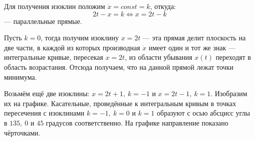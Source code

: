 \documentclass[a4paper,12pt]{article}
\newcommand{\dx}{\dot{x}}
\begin{document}
Для получения изоклин положим $\dx = const = k$, откуда:
\[2t - x = k \iff x = 2t - k\] --- параллельные прямые.

Пусть $k = 0$, тогда получим изоклину $x = 2t$ --- эта прямая делит плоскость на две части, в каждой из которых производная $\dx$ имеет один и тот же знак --- интегральные кривые, пересекая $x = 2t$, из области убывания $x(t)$ переходят в область возрастания. Отсюда получаем, что на данной прямой лежат точки минимума.

Возьмём ещё две изоклины: $x = 2t + 1,\ k = -1$ и $x = 2t - 1,\ k = 1$. Изобразим их на графике. Касательные, проведённые к интегральным кривым в точках пересечения с изоклинами $k = -1,\ k = 0$ и $k = 1$ образуют с осью абсцисс углы в $135,\ 0$ и $45$ градусов соответственно. На графике направление показано чёрточками.
\end{document}
